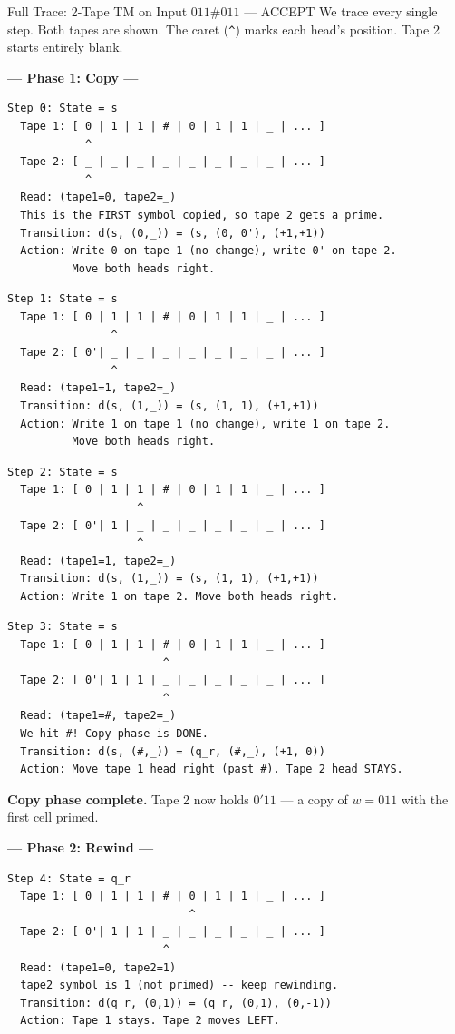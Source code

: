 \begin{examplebox}{{Full Trace: 2-Tape TM on Input $011\#011$ --- ACCEPT}}
We trace every single step. Both tapes are shown. The caret (\texttt{\^{}}) marks each head's position. Tape 2 starts entirely blank.

\textbf{--- Phase 1: Copy ---}

\begin{lstlisting}
Step 0: State = s
  Tape 1: [ 0 | 1 | 1 | # | 0 | 1 | 1 | _ | ... ]
            ^
  Tape 2: [ _ | _ | _ | _ | _ | _ | _ | _ | ... ]
            ^
  Read: (tape1=0, tape2=_)
  This is the FIRST symbol copied, so tape 2 gets a prime.
  Transition: d(s, (0,_)) = (s, (0, 0'), (+1,+1))
  Action: Write 0 on tape 1 (no change), write 0' on tape 2.
          Move both heads right.
\end{lstlisting}

\begin{lstlisting}
Step 1: State = s
  Tape 1: [ 0 | 1 | 1 | # | 0 | 1 | 1 | _ | ... ]
                ^
  Tape 2: [ 0'| _ | _ | _ | _ | _ | _ | _ | ... ]
                ^
  Read: (tape1=1, tape2=_)
  Transition: d(s, (1,_)) = (s, (1, 1), (+1,+1))
  Action: Write 1 on tape 1 (no change), write 1 on tape 2.
          Move both heads right.
\end{lstlisting}

\begin{lstlisting}
Step 2: State = s
  Tape 1: [ 0 | 1 | 1 | # | 0 | 1 | 1 | _ | ... ]
                    ^
  Tape 2: [ 0'| 1 | _ | _ | _ | _ | _ | _ | ... ]
                    ^
  Read: (tape1=1, tape2=_)
  Transition: d(s, (1,_)) = (s, (1, 1), (+1,+1))
  Action: Write 1 on tape 2. Move both heads right.
\end{lstlisting}

\begin{lstlisting}
Step 3: State = s
  Tape 1: [ 0 | 1 | 1 | # | 0 | 1 | 1 | _ | ... ]
                        ^
  Tape 2: [ 0'| 1 | 1 | _ | _ | _ | _ | _ | ... ]
                        ^
  Read: (tape1=#, tape2=_)
  We hit #! Copy phase is DONE.
  Transition: d(s, (#,_)) = (q_r, (#,_), (+1, 0))
  Action: Move tape 1 head right (past #). Tape 2 head STAYS.
\end{lstlisting}

\textbf{Copy phase complete.} Tape 2 now holds $0'11$ --- a copy of $w = 011$ with the first cell primed.

\bigskip
\textbf{--- Phase 2: Rewind ---}

\begin{lstlisting}
Step 4: State = q_r
  Tape 1: [ 0 | 1 | 1 | # | 0 | 1 | 1 | _ | ... ]
                            ^
  Tape 2: [ 0'| 1 | 1 | _ | _ | _ | _ | _ | ... ]
                        ^
  Read: (tape1=0, tape2=1)
  tape2 symbol is 1 (not primed) -- keep rewinding.
  Transition: d(q_r, (0,1)) = (q_r, (0,1), (0,-1))
  Action: Tape 1 stays. Tape 2 moves LEFT.
\end{lstlisting}


\end{examplebox}

